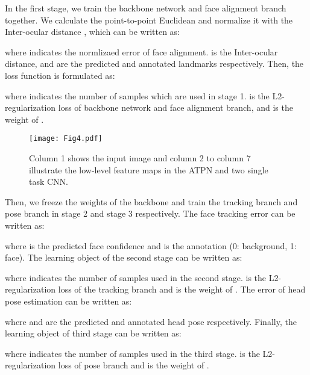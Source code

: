 \documentclass[3p,twocolumn, round, sort & compress]{elsarticle}
\begin{document}
In the first stage, we train the backbone network and face alignment branch together. We calculate the point-to-point Euclidean and normalize it with the Inter-ocular distance \citep{300W}, which can be written as:

where  indicates the normlizaed error of face alignment.  is the Inter-ocular distance,  and  are the predicted and annotated landmarks respectively. Then, the loss function is formulated as:

where  indicates the number of samples which are used in stage 1.  is the L2-regularization loss of backbone network and face alignment branch, and  is the weight of .

\begin{figure}[t!]
	\centering
	\texttt{[image: Fig4.pdf]}
	\caption{Column 1 shows the input image and column 2 to column 7 illustrate the low-level feature maps in the ATPN and two single task CNN.}
	\label{fig4}
\end{figure}

Then, we freeze the weights of the backbone and train the tracking branch and pose branch in stage 2 and stage 3 respectively. The face tracking error  can be written as:

where  is the predicted face confidence and  is the annotation (0: background, 1: face). The learning object of the second stage can be written as:

where  indicates the number of samples used in the second stage.  is the L2-regularization loss of the tracking branch and  is the weight of . The error of head pose estimation  can be written as:

where  and  are the predicted and annotated head pose respectively. Finally, the learning object of third stage can be written as:

where  indicates the number of samples used in the third stage.  is the L2-regularization loss of pose branch and  is the weight of .
\end{document}

